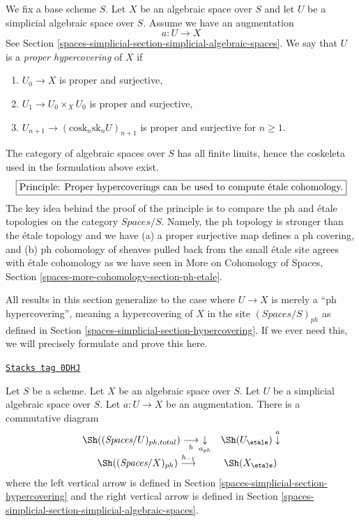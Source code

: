 \medskip\noindent
We fix a base scheme $S$.
Let $X$ be an algebraic space over $S$ and let $U$ be a simplicial
algebraic space over $S$. Assume we have an augmentation
$$
a : U \to X
$$
See Section \ref{spaces-simplicial-section-simplicial-algebraic-spaces}.
We say that $U$ is a {\it proper hypercovering} of $X$ if
\begin{enumerate}
\item $U_0 \to X$ is proper and surjective,
\item $U_1 \to U_0 \times_X U_0$ is proper and surjective,
\item $U_{n + 1} \to (\text{cosk}_n\text{sk}_n U)_{n + 1}$
is proper and surjective for $n \geq 1$.
\end{enumerate}
The category of algebraic spaces over $S$ has all finite limits, hence the
coskeleta used in the formulation above exist.
$$
\fbox{Principle: Proper hypercoverings can be
used to compute \'etale cohomology.}
$$
The key idea behind the proof of the principle is to compare the
ph and \'etale topologies on the category $\textit{Spaces}/S$.
Namely, the ph topology is stronger than the \'etale topology and we have
(a) a proper surjective map defines a ph covering, and
(b) ph cohomology of sheaves pulled back from the small \'etale site
agrees with \'etale cohomology as we have seen in
More on Cohomology of Spaces, Section
\ref{spaces-more-cohomology-section-ph-etale}.

\medskip\noindent
All results in this section generalize to the case
where $U \to X$ is merely a ``ph hypercovering'', meaning a
hypercovering of $X$ in the site $(\textit{Spaces}/S)_{ph}$
as defined in Section \ref{spaces-simplicial-section-hypercovering}. If we ever need
this, we will precisely formulate and prove this here.

\begin{lemma}
\label{spaces-simplicial-lemma-compare-simplicial-objects-ph-etale}
\href{https://stacks.math.columbia.edu/tag/0DHJ}{\texttt{Stacks tag 0DHJ}}

Let $S$ be a scheme. Let $X$ be an algebraic space over $S$.
Let $U$ be a simplicial algebraic space over $S$.
Let $a : U \to X$ be an augmentation. There is a commutative diagram
$$
\begin{array}{cc}\Sh((\textit{Spaces}/U)_{ph, total}) \underset{h}{\longrightarrow}\underset{a_{ph}}{\downarrow} & \Sh(U_\etale) \overset{a}{\downarrow} \\ \Sh((\textit{Spaces}/X)_{ph}) \overset{h_{-1}}{\longrightarrow} & \Sh(X_\etale)\end{array}
$$
where the left vertical arrow is defined in
Section \ref{spaces-simplicial-section-hypercovering}
and the right vertical arrow is defined in
Section \ref{spaces-simplicial-section-simplicial-algebraic-spaces}.
\end{lemma}

